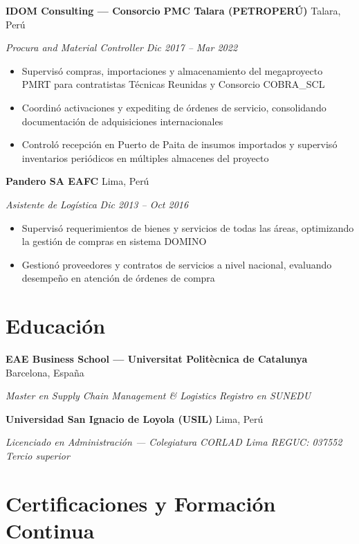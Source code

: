 \documentclass[10.5pt,letterpaper]{article}
\newcommand{\entry}[4]{%
  \noindent\textbf{#1} \hfill #2 \par\nopagebreak
  \textit{#3} \hfill \textit{#4} \par\nopagebreak
}
\begin{document}
\entry{IDOM Consulting — Consorcio PMC Talara (PETROPERÚ)}{Talara, Perú}{Procura and Material Controller}{Dic 2017 -- Mar 2022}
\begin{itemize}
  \item Supervisó compras, importaciones y almacenamiento del megaproyecto PMRT para contratistas Técnicas Reunidas y Consorcio COBRA\_SCL
  \item Coordinó activaciones y expediting de órdenes de servicio, consolidando documentación de adquisiciones internacionales
  \item Controló recepción en Puerto de Paita de insumos importados y supervisó inventarios periódicos en múltiples almacenes del proyecto
\end{itemize}
\vspace{0.2em}

\entry{Pandero SA EAFC}{Lima, Perú}{Asistente de Logística}{Dic 2013 -- Oct 2016}
\begin{itemize}
  \item Supervisó requerimientos de bienes y servicios de todas las áreas, optimizando la gestión de compras en sistema DOMINO
  \item Gestionó proveedores y contratos de servicios a nivel nacional, evaluando desempeño en atención de órdenes de compra
\end{itemize}
\vspace{0.2em}

\section{Educación}

\entry{EAE Business School — Universitat Politècnica de Catalunya}{Barcelona, España}{Master en Supply Chain Management \& Logistics}{Registro en SUNEDU}
\vspace{0.2em}

\entry{Universidad San Ignacio de Loyola (USIL)}{Lima, Perú}{Licenciado en Administración — Colegiatura CORLAD Lima REGUC: 037552}{Tercio superior}
\vspace{0.2em}

\section{Certificaciones y Formación Continua}
\end{document}
